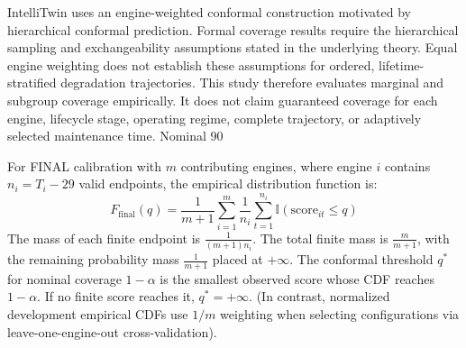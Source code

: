 IntelliTwin uses an engine-weighted conformal construction motivated by hierarchical conformal prediction. Formal coverage results require the hierarchical sampling and exchangeability assumptions stated in the underlying theory. Equal engine weighting does not establish these assumptions for ordered, lifetime-stratified degradation trajectories. This study therefore evaluates marginal and subgroup coverage empirically. It does not claim guaranteed coverage for each engine, lifecycle stage, operating regime, complete trajectory, or adaptively selected maintenance time. Nominal 90%

For FINAL calibration with $m$ contributing engines, where engine $i$ contains $n_i = T_i - 29$ valid endpoints, the empirical distribution function is:
\begin{equation}
F_{\text{final}}(q) = \frac{1}{m + 1} \sum_{i=1}^m \frac{1}{n_i} \sum_{t=1}^{n_i} \mathbb{I}(\text{score}_{it} \le q)
\end{equation}
The mass of each finite endpoint is $\frac{1}{(m+1)n_i}$. The total finite mass is $\frac{m}{m+1}$, with the remaining probability mass $\frac{1}{m+1}$ placed at $+\infty$. The conformal threshold $q^*$ for nominal coverage $1 - \alpha$ is the smallest observed score whose CDF reaches $1 - \alpha$. If no finite score reaches it, $q^* = +\infty$. (In contrast, normalized development empirical CDFs use $1/m$ weighting when selecting configurations via leave-one-engine-out cross-validation).


